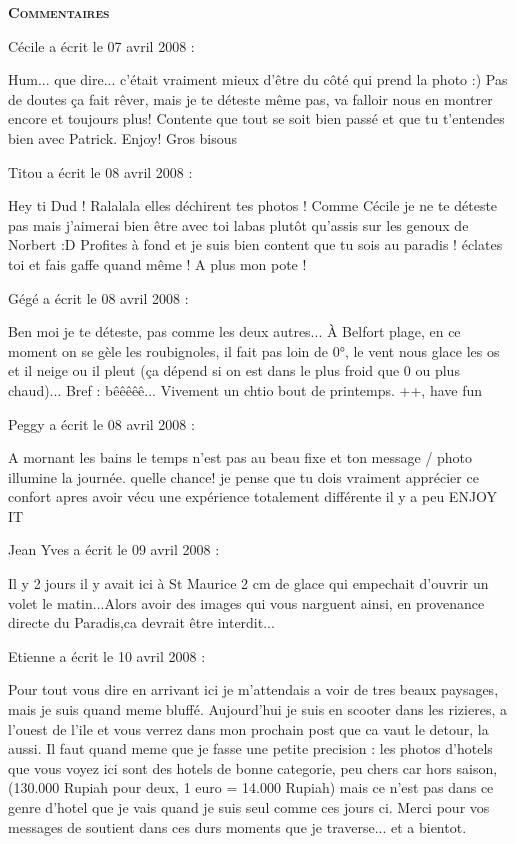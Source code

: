 \bigskip
\textbf{\textsc{Commentaires}}

\medskip
Cécile a écrit le 07 avril 2008 :
\begin{displayquote}
Hum... que dire... c'était vraiment mieux d'être du côté qui prend la photo :) Pas de doutes ça fait rêver, mais je te déteste même pas, va falloir nous en montrer encore et toujours plus!
Contente que tout se soit bien passé et que tu t'entendes bien avec Patrick. Enjoy!
Gros bisous
\end{displayquote}

\medskip
Titou a écrit le 08 avril 2008 :
\begin{displayquote}
Hey ti Dud !
Ralalala elles déchirent tes photos ! Comme Cécile je ne te déteste pas mais j'aimerai bien être avec toi labas plutôt qu'assis sur les genoux de Norbert :D
Profites à fond et je suis bien content que tu sois au paradis ! éclates toi et fais gaffe quand même !
A plus mon pote !
\end{displayquote}

\medskip
Gégé a écrit le 08 avril 2008 :
\begin{displayquote}
Ben moi je te déteste, pas comme les deux autres...
À Belfort plage, en ce moment on se gèle les roubignoles, il fait pas loin de 0°, le vent nous glace les os et il neige ou il pleut (ça dépend si on est dans le plus froid que 0 ou plus chaud)... Bref : bêêêêê...
Vivement un chtio bout de printemps.
++, have fun
\end{displayquote}

\medskip
Peggy a écrit le 08 avril 2008 :
\begin{displayquote}
A mornant les bains le temps n'est pas au beau fixe et ton message / photo illumine la journée.
quelle chance! 
je pense que tu dois vraiment apprécier ce confort apres avoir vécu une expérience totalement différente il y a peu
ENJOY IT
\end{displayquote}

\medskip
Jean Yves  a écrit le 09 avril 2008 :
\begin{displayquote}
Il y 2 jours il y avait ici à St Maurice 2 cm de glace qui empechait d'ouvrir un volet le matin...Alors avoir des images qui vous narguent ainsi, en provenance directe du Paradis,ca devrait être interdit...
\end{displayquote}

\medskip
Etienne a écrit le 10 avril 2008 :
\begin{displayquote}
Pour tout vous dire en arrivant ici je m'attendais a voir de tres beaux paysages, mais je suis quand meme bluffé.
Aujourd'hui je suis en scooter dans les rizieres, a l'ouest de l'ile et vous verrez dans mon prochain post que ca vaut le detour, la aussi.
Il faut quand meme que je fasse une petite precision : les photos d'hotels que vous voyez ici sont des hotels de bonne categorie, peu chers car hors saison, (130.000 Rupiah pour deux, 1 euro = 14.000 Rupiah) mais ce n'est pas dans ce genre d'hotel que je vais quand je suis seul comme ces jours ci.
Merci pour vos messages de soutient dans ces durs moments que je traverse... et a bientot.
\end{displayquote}

